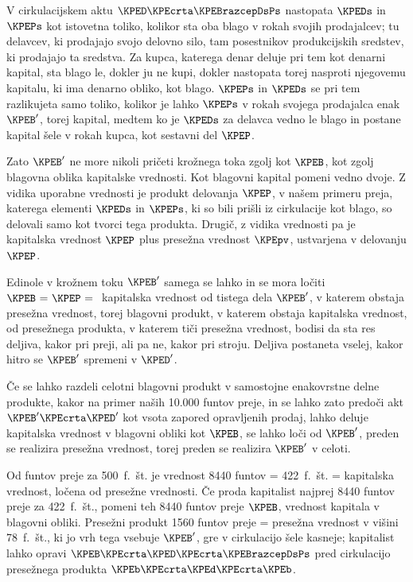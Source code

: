 \documentclass[kapital_02.tex]{subfiles}
\begin{document}
V cirkulacijskem aktu \( \KPED \KPEcrta \KPEBrazcepDsPs \) nastopata \( \KPEDs \) in \( \KPEPs \) kot istovetna toliko, kolikor sta oba blago v rokah svojih prodajalcev; tu delavcev, ki prodajajo svojo delovno silo, tam posestnikov produkcijskih sredstev, ki prodajajo ta sredstva. Za kupca, katerega denar deluje pri tem kot denarni kapital, sta blago le, dokler ju ne kupi, dokler nastopata torej nasproti njegovemu kapitalu, ki ima denarno obliko, kot blago. \( \KPEPs \) in \( \KPEDs \) se pri tem razlikujeta samo toliko, kolikor je lahko \( \KPEPs \) v rokah svojega prodajalca enak \( \KPEB' \), torej kapital, medtem ko je \( \KPEDs \) za delavca vedno le blago in postane kapital šele v rokah kupca, kot sestavni del \( \KPEP \).

Zato \( \KPEB' \) ne more nikoli pričeti krožnega toka zgolj kot \( \KPEB \), kot zgolj blagovna oblika kapitalske vrednosti. Kot blagovni kapital pomeni vedno dvoje. Z vidika uporabne vrednosti je produkt delovanja \( \KPEP \), v našem primeru preja, katerega elementi \( \KPEDs \) in \( \KPEPs \), ki so bili prišli iz cirkulacije kot blago, so delovali samo kot tvorci tega produkta. Drugič, z vidika vrednosti pa je kapitalska vrednost \( \KPEP \) plus presežna vrednost \( \KPEpv \), ustvarjena v delovanju \( \KPEP \).

Edinole v krožnem toku \( \KPEB' \) samega se lahko in se mora ločiti \( \KPEB \textrm{ = } \KPEP \textrm{ = } \) kapitalska vrednost od tistega dela \( \KPEB' \), v katerem obstaja presežna vrednost, torej blagovni produkt, v katerem obstaja kapitalska vrednost, od presežnega produkta, v katerem tiči presežna vrednost, bodisi da sta res deljiva, kakor pri preji, ali pa ne, kakor pri stroju. Deljiva postaneta vselej, kakor hitro se \( \KPEB' \) spremeni v \( \KPED' \).

Če se lahko razdeli celotni blagovni produkt v samostojne enakovrstne delne produkte, kakor na primer naših 10.000 funtov preje, in se lahko zato predoči akt \( \KPEB' \KPEcrta \KPED' \) kot vsota zapored opravljenih prodaj, lahko deluje kapitalska vrednost v blagovni obliki kot \( \KPEB \), se lahko loči od \( \KPEB' \), preden se realizira presežna vrednost, torej preden se realizira \( \KPEB' \) v celoti.

Od  funtov preje za 500~f.~št. je vrednost 8440 funtov = 422~f.~št. = kapitalska vrednost, ločena od presežne vrednosti. Če proda kapitalist najprej 8440 funtov preje za 422~f.~št., pomeni teh 8440 funtov preje \( \KPEB \), vrednost kapitala v blagovni obliki. Presežni produkt 1560 funtov preje = presežna vrednost v višini 78~f.~št., ki jo vrh tega vsebuje \( \KPEB' \), gre v cirkulacijo šele kasneje; kapitalist lahko opravi \( \KPEB \KPEcrta \KPED \KPEcrta \KPEBrazcepDsPs \) pred cirkulacijo presežnega produkta \( \KPEb \KPEcrta \KPEd \KPEcrta \KPEb \).
\end{document}
